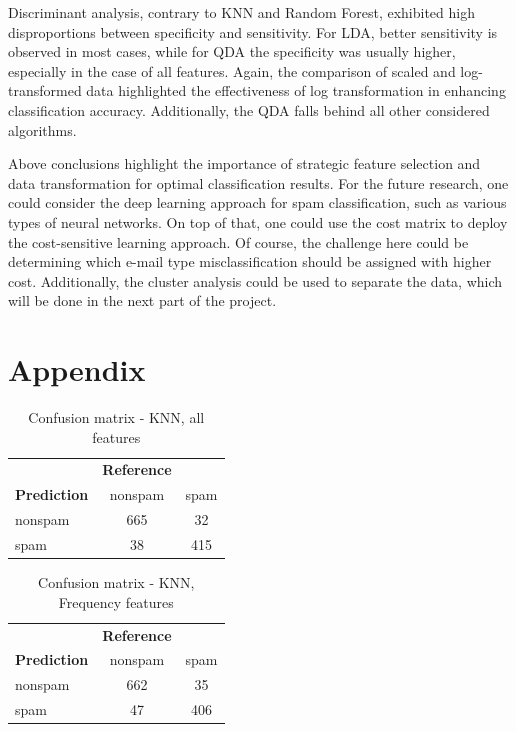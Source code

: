 \documentclass{article}\usepackage[]{graphicx}\usepackage[]{xcolor}
\begin{document}
Discriminant analysis, contrary to KNN and Random Forest, exhibited high disproportions 
between specificity and sensitivity. For LDA, better sensitivity is observed in 
most cases, while for QDA the specificity was usually higher, especially in the 
case of all features. Again, the comparison of scaled and log-transformed data 
highlighted the effectiveness of log transformation in enhancing classification accuracy.
Additionally, the QDA falls behind all other considered algorithms.

Above conclusions highlight the importance of strategic feature selection and data 
transformation for optimal classification results. For the future research, one
could consider the deep learning approach for spam classification, such as various
types of neural networks. On top of that, one could use the cost matrix to deploy
the cost-sensitive learning approach. Of course, the challenge here could be 
determining which e-mail type misclassification should be assigned with higher cost.
Additionally, the cluster analysis could be used to separate the data, which
will be done in the next part of the project.

\clearpage

\section{Appendix}
\label{sec:appendix}

\begin{table}[h]
    \centering
    \begin{tabular}{lcc}
        & \textbf{Reference} & \\
        \textbf{Prediction} & nonspam & spam \\
        nonspam & 665 & 32 \\
        spam & 38 & 415 \\
    \end{tabular}
    \caption{Confusion matrix - KNN, all features}
    \label{KNNcm1}
\end{table}

\begin{table}[h]
    \centering
    \begin{tabular}{lcc}
        & \textbf{Reference} & \\
        \textbf{Prediction} & nonspam & spam \\
        nonspam & 662 & 35 \\
        spam & 47 & 406 \\
    \end{tabular}
    \caption{Confusion matrix - KNN, Frequency features}
    \label{KNNcm2}
\end{table}
\end{document}
